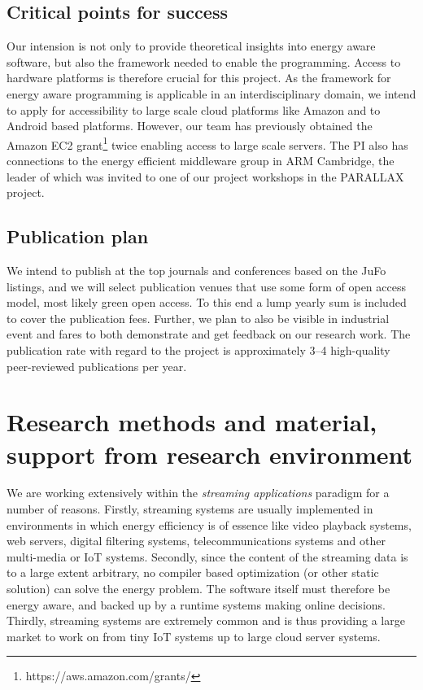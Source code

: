 \documentclass{article}
\begin{document}
\subsection{Critical points for success}
Our intension is not only to provide theoretical insights into energy aware software, but also the framework needed to enable the programming.
Access to hardware platforms is therefore crucial for this project.
As the framework for energy aware programming is applicable in an interdisciplinary domain, we intend to apply for accessibility to large scale cloud platforms like Amazon and to Android based platforms.
However, our team has previously obtained the Amazon EC2 grant\footnote{https://aws.amazon.com/grants/} twice enabling access to large scale servers.
The PI also has connections to the energy efficient middleware group in ARM Cambridge, the leader of which was invited to one of our project workshops in the PARALLAX project.

\subsection{Publication plan}
We intend to publish at the top journals and conferences based on the JuFo listings, and we will select publication venues that use some form of open access model, most likely green open access. 
To this end a lump yearly sum is included to cover the publication fees. 
Further, we plan to also be visible in industrial event and fares to both demonstrate and get feedback on our research work.
The publication rate with regard to the project is approximately 3--4 high-quality peer-reviewed publications per year.

\section{Research methods and material, support from research environment}

We are working extensively within the \textit{streaming applications} paradigm for a number of reasons. 
Firstly, streaming systems are usually implemented in environments in which energy efficiency is of essence like video playback systems, web servers, digital filtering systems, telecommunications systems and other multi-media or IoT systems. 
Secondly, since the content of the streaming data is to a large extent arbitrary, no compiler based optimization (or other static solution) can solve the energy problem. 
The software itself must therefore be energy aware, and backed up by a runtime systems making online decisions. 
Thirdly, streaming systems are extremely common and is thus providing a large market to work on from tiny IoT systems up to large cloud server systems.\smallskip
\end{document}
